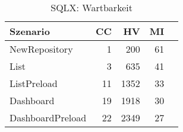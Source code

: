 \begin{table}[ht]
\centering
\caption{SQLX: Wartbarkeit}
\begin{tabular}{lrrrr}
\toprule
Szenario & CC & HV & MI \\
\midrule
	NewRepository & 1 & 200 & 61 \\
	List & 3 & 635 & 41 \\
	ListPreload & 11 & 1352 & 33 \\
	Dashboard & 19 & 1918 & 30 \\
	DashboardPreload & 22 & 2349 & 27 \\
\bottomrule
\end{tabular}
\label{tab:sqlx_maintainability}
\end{table}
	